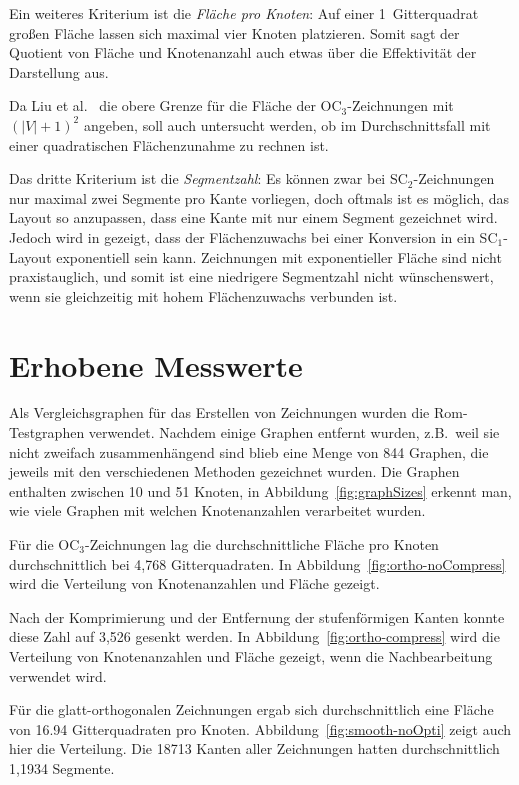 \documentclass[a4paper]{scrreprt}
\theoremstyle{definition}
\begin{document}
Ein weiteres Kriterium ist die \emph{Fläche pro Knoten}: Auf einer 1~Gitterquadrat großen Fläche lassen sich maximal vier Knoten platzieren. Somit sagt der Quotient von Fläche und Knotenanzahl auch etwas über die Effektivität der Darstellung aus.

Da Liu et al.~\cite{liu+etal-98} die obere Grenze für die Fläche der OC$_3$-Zeichnungen mit $(|V|+1)^2$ angeben, soll auch untersucht werden, ob im Durchschnittsfall mit einer quadratischen Flächenzunahme zu rechnen ist.

Das dritte Kriterium ist die \emph{Segmentzahl}: Es können zwar bei SC$_2$-Zeichnungen nur maximal zwei Segmente pro Kante vorliegen, doch oftmals ist es möglich, das Layout so anzupassen, dass eine Kante mit nur einem Segment gezeichnet wird.  Jedoch wird in \cite{bekos-13} gezeigt, dass der Flächenzuwachs bei einer Konversion in ein SC$_1$-Layout exponentiell sein kann. Zeichnungen mit exponentieller Fläche sind nicht praxistauglich, und somit ist eine niedrigere Segmentzahl nicht wünschenswert, wenn sie gleichzeitig mit hohem Flächenzuwachs verbunden ist.

\section{Erhobene Messwerte}

Als Vergleichsgraphen für das Erstellen von Zeichnungen wurden die Rom-Testgraphen verwendet. Nachdem einige Graphen entfernt wurden, z.B.\ weil sie nicht zweifach zusammenhängend sind blieb eine Menge von 844 Graphen, die jeweils mit den verschiedenen Methoden gezeichnet wurden. Die Graphen enthalten zwischen 10 und 51 Knoten, in Abbildung~\ref{fig:graphSizes} erkennt man, wie viele Graphen mit welchen Knotenanzahlen verarbeitet wurden. %

Für die OC$_3$-Zeichnungen lag die durchschnittliche Fläche pro Knoten durchschnittlich bei 4,768 Gitterquadraten. In Abbildung~\ref{fig:ortho-noCompress} wird die Verteilung von Knotenanzahlen und Fläche gezeigt.

Nach der Komprimierung und der Entfernung der stufenförmigen Kanten konnte diese Zahl auf 3,526 gesenkt werden. In Abbildung~\ref{fig:ortho-compress} wird die Verteilung von Knotenanzahlen und Fläche gezeigt, wenn die Nachbearbeitung verwendet wird.

Für die glatt-orthogonalen Zeichnungen ergab sich durchschnittlich eine Fläche von 16.94 Gitterquadraten pro Knoten. Abbildung~\ref{fig:smooth-noOpti} zeigt auch hier die Verteilung. Die 18713 Kanten aller Zeichnungen hatten durchschnittlich 1,1934 Segmente.
\end{document}

